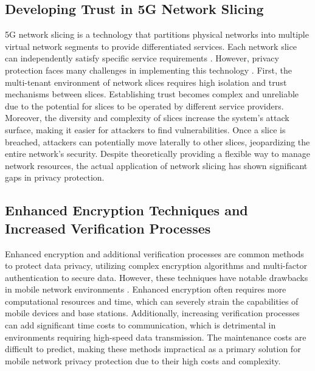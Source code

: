\documentclass[sigplan,screen]{acmart}
\begin{document}
\subsection{Developing Trust in 5G Network Slicing}
5G network slicing is a technology that partitions physical networks into multiple virtual network segments to provide differentiated services. Each network slice can independently satisfy specific service requirements \cite{jin2020research}. However, privacy protection faces many challenges in implementing this technology \cite{kholidy2022toward}. First, the multi-tenant environment of network slices requires high isolation and trust mechanisms between slices. Establishing trust becomes complex and unreliable due to the potential for slices to be operated by different service providers. Moreover, the diversity and complexity of slices increase the system's attack surface, making it easier for attackers to find vulnerabilities. Once a slice is breached, attackers can potentially move laterally to other slices, jeopardizing the entire network's security. Despite theoretically providing a flexible way to manage network resources, the actual application of network slicing has shown significant gaps in privacy protection.

\subsection{Enhanced Encryption Techniques and Increased Verification Processes}
Enhanced encryption and additional verification processes are common methods to protect data privacy, utilizing complex encryption algorithms and multi-factor authentication to secure data. However, these techniques have notable drawbacks in mobile network environments \cite{nie2022measuring}. Enhanced encryption often requires more computational resources and time, which can severely strain the capabilities of mobile devices and base stations. Additionally, increasing verification processes can add significant time costs to communication, which is detrimental in environments requiring high-speed data transmission. The maintenance costs are difficult to predict, making these methods impractical as a primary solution for mobile network privacy protection due to their high costs and complexity. 
\end{document}
